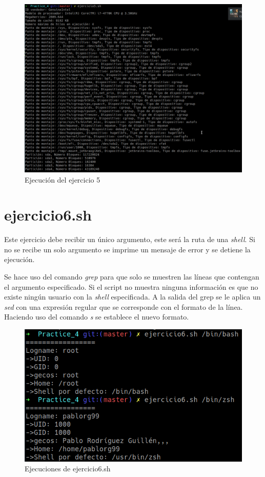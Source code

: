 \documentclass[12pt,a4paper]{article}
\begin{document}
\begin{figure}[ht]
	\centering
	\includegraphics[width=1\textwidth]{images/ejercicio5.png}
	\caption{Ejecución del ejercicio 5}
\end{figure}

\newpage

\section{ejercicio6.sh}
Este ejercicio debe recibir un único argumento, este será la ruta de una \emph{shell}. Si no se recibe un solo argumento se imprime un mensaje de error y se detiene la ejecución.

Se hace uso del comando \emph{grep} para que solo se muestren las líneas que contengan el argumento especificado. Si el script no muestra ninguna información es que no existe ningún usuario con la \emph{shell} especificada. A la salida del grep se le aplica un \emph{sed} con una expresión regular que se corresponde con el formato de la línea. Haciendo uso del comando \emph{s} se establece el nuevo formato.

\begin{figure}[ht]
	\centering
	\includegraphics[width=1\textwidth]{images/ejercicio6.png}
	\caption{Ejecuciones de ejercicio6.sh}
\end{figure}
\end{document}
